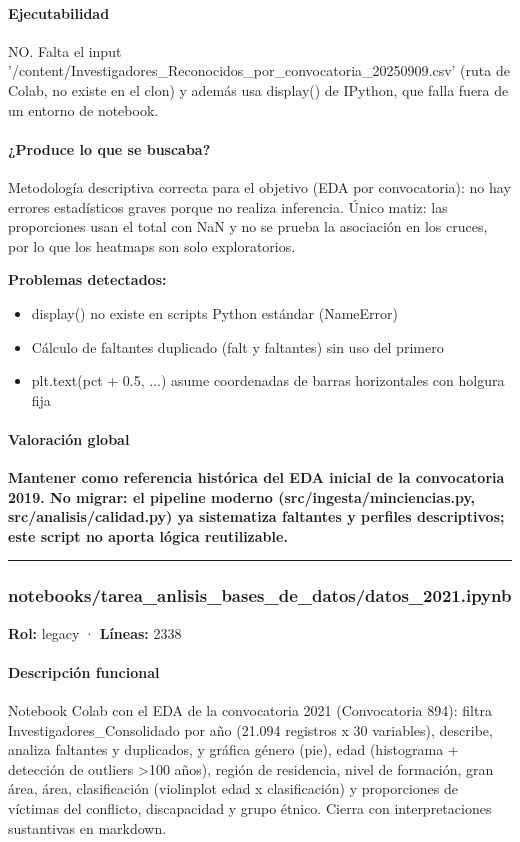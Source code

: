 \paragraph{Ejecutabilidad}
NO. Falta el input '/content/Investigadores\_Reconocidos\_por\_convocatoria\_20250909.csv' (ruta de Colab, no existe en el clon) y además usa display() de IPython, que falla fuera de un entorno de notebook.

\paragraph{¿Produce lo que se buscaba?}
Metodología descriptiva correcta para el objetivo (EDA por convocatoria): no hay errores estadísticos graves porque no realiza inferencia. Único matiz: las proporciones usan el total con NaN y no se prueba la asociación en los cruces, por lo que los heatmaps son solo exploratorios.

\begin{tcolorbox}[riesgo]
\textbf{Problemas detectados:}
\begin{itemize}
  \item display() no existe en scripts Python estándar (NameError)
  \item Cálculo de faltantes duplicado (falt y faltantes) sin uso del primero
  \item plt.text(pct + 0.5, ...) asume coordenadas de barras horizontales con holgura fija
\end{itemize}
\end{tcolorbox}

\paragraph{Valoración global}
\textbf{Mantener como referencia histórica del EDA inicial de la convocatoria 2019. No migrar: el pipeline moderno (src/ingesta/minciencias.py, src/analisis/calidad.py) ya sistematiza faltantes y perfiles descriptivos; este script no aporta lógica reutilizable.}

\medskip
\hrule

\subsubsection{notebooks/tarea\_anlisis\_bases\_de\_datos/datos\_2021.ipynb}
\textbf{Rol:} legacy · \textbf{Líneas:} 2338

\paragraph{Descripción funcional}
Notebook Colab con el EDA de la convocatoria 2021 (Convocatoria 894): filtra Investigadores\_Consolidado por año (21.094 registros x 30 variables), describe, analiza faltantes y duplicados, y gráfica género (pie), edad (histograma + detección de outliers >100 años), región de residencia, nivel de formación, gran área, área, clasificación (violinplot edad x clasificación) y proporciones de víctimas del conflicto, discapacidad y grupo étnico. Cierra con interpretaciones sustantivas en markdown.

